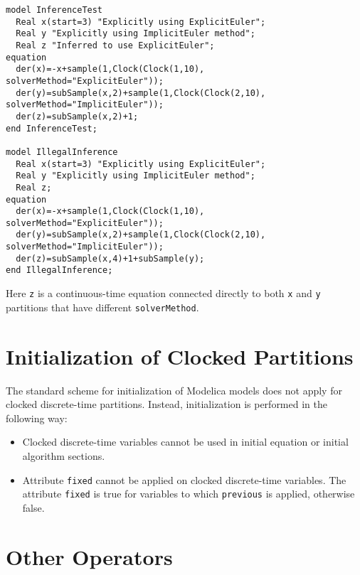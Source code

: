 \begin{example}
\begin{lstlisting}[language=modelica]
model InferenceTest
  Real x(start=3) "Explicitly using ExplicitEuler";
  Real y "Explicitly using ImplicitEuler method";
  Real z "Inferred to use ExplicitEuler";
equation
  der(x)=-x+sample(1,Clock(Clock(1,10), solverMethod="ExplicitEuler"));
  der(y)=subSample(x,2)+sample(1,Clock(Clock(2,10), solverMethod="ImplicitEuler"));
  der(z)=subSample(x,2)+1;
end InferenceTest;

model IllegalInference
  Real x(start=3) "Explicitly using ExplicitEuler";
  Real y "Explicitly using ImplicitEuler method";
  Real z;
equation
  der(x)=-x+sample(1,Clock(Clock(1,10), solverMethod="ExplicitEuler"));
  der(y)=subSample(x,2)+sample(1,Clock(Clock(2,10), solverMethod="ImplicitEuler"));
  der(z)=subSample(x,4)+1+subSample(y);
end IllegalInference;
\end{lstlisting}
Here \lstinline!z! is a continuous-time equation connected directly to both \lstinline!x! and \lstinline!y! partitions that have different \lstinline!solverMethod!.
\end{example}

\section{Initialization of Clocked Partitions}\label{initialization-of-clocked-partitions}

The standard scheme for initialization of Modelica models does not apply
for clocked discrete-time partitions. Instead, initialization is
performed in the following way:
\begin{itemize}
\item
  Clocked discrete-time variables cannot be used in initial equation or
  initial algorithm sections.
\item
  Attribute \lstinline!fixed! cannot be applied on clocked discrete-time
  variables. The attribute \lstinline!fixed! is true for variables to which
  \lstinline!previous! is applied, otherwise false.
\end{itemize}

\section{Other Operators}\label{other-operators}


